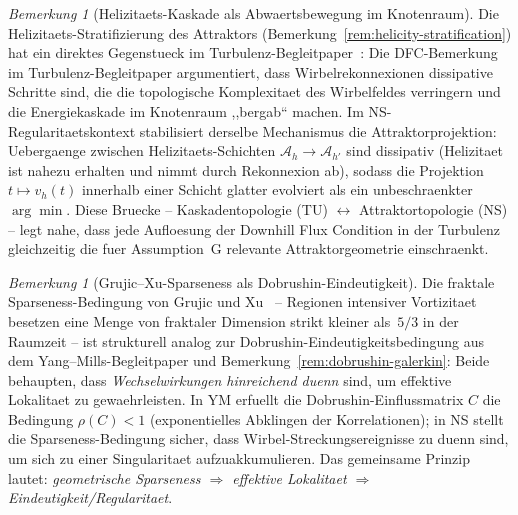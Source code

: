 \documentclass[12pt,a4paper]{article}
\theoremstyle{definition}
\theoremstyle{plain}
\theoremstyle{remark}
\newtheorem{remark}[definition]{Bemerkung}
\begin{document}
\begin{remark}[Helizitaets-Kaskade als Abwaertsbewegung im Knotenraum]
\label{rem:helicity-cascade-bridge}
Die Helizitaets-Stratifizierung des Attraktors
(Bemerkung~\ref{rem:helicity-stratification}) hat ein direktes
Gegenstueck im Turbulenz-Begleitpaper~\cite{FST-TU2026}:
Die DFC-Bemerkung im Turbulenz-Begleitpaper argumentiert, dass Wirbelrekonnexionen dissipative
Schritte sind, die die topologische Komplexitaet des Wirbelfeldes
verringern und die Energiekaskade im Knotenraum ,,bergab`` machen.
Im NS-Regularitaetskontext stabilisiert derselbe Mechanismus die
Attraktorprojektion: Uebergaenge zwischen Helizitaets-Schichten
$\mathcal{A}_h \to \mathcal{A}_{h'}$ sind dissipativ (Helizitaet
ist nahezu erhalten und nimmt durch Rekonnexion ab), sodass die
Projektion $t \mapsto v_h(t)$ innerhalb einer Schicht glatter
evolviert als ein unbeschraenkter $\arg\min$. Diese Bruecke --
Kaskadentopologie (TU) $\leftrightarrow$ Attraktortopologie (NS) --
legt nahe, dass jede Aufloesung der Downhill Flux Condition in der
Turbulenz gleichzeitig die fuer Assumption~G relevante
Attraktorgeometrie einschraenkt.
\end{remark}

\begin{remark}[Grujic--Xu-Sparseness als Dobrushin-Eindeutigkeit]
\label{rem:sparseness-dobrushin}
Die fraktale Sparseness-Bedingung von Grujic und
Xu~\cite{GrujicXu2025} -- Regionen intensiver Vortizitaet besetzen
eine Menge von fraktaler Dimension strikt kleiner als~$5/3$ in der
Raumzeit -- ist strukturell analog zur Dobrushin-Eindeutigkeitsbedingung
aus dem Yang--Mills-Begleitpaper und
Bemerkung~\ref{rem:dobrushin-galerkin}: Beide behaupten, dass
\emph{Wechselwirkungen hinreichend duenn} sind, um effektive Lokalitaet
zu gewaehrleisten. In YM erfuellt die Dobrushin-Einflussmatrix $C$ die
Bedingung $\rho(C) < 1$ (exponentielles Abklingen der Korrelationen);
in NS stellt die Sparseness-Bedingung sicher, dass
Wirbel-Streckungsereignisse zu duenn sind, um sich zu einer
Singularitaet aufzuakkumulieren. Das gemeinsame Prinzip lautet:
\emph{geometrische Sparseness $\Rightarrow$ effektive Lokalitaet
$\Rightarrow$ Eindeutigkeit/Regularitaet}.
\end{remark}
\end{document}
